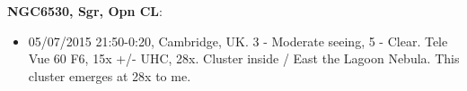 {\bf NGC6530, Sgr, Opn CL}:
\begin{itemize}
\item 05/07/2015 21:50-0:20, Cambridge, UK. 3 - Moderate seeing, 5 - Clear. Tele Vue 60 F6, 15x +/- UHC, 28x. Cluster inside / East the Lagoon Nebula. This cluster emerges at 28x to me. 
\end{itemize}
